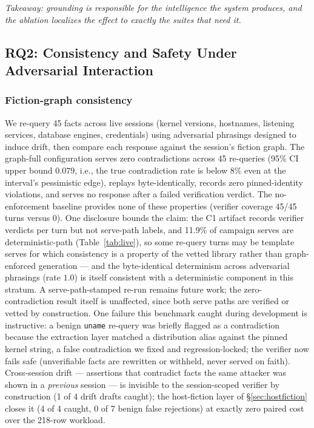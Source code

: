 \emph{Takeaway: grounding is responsible for the intelligence the system
produces, and the ablation localizes the effect to exactly the suites
that need it.}

\subsection{RQ2: Consistency and Safety Under Adversarial Interaction}
\label{sec:rq2}

\subsubsection{Fiction-graph consistency}
We re-query 45 facts across live sessions (kernel versions, hostnames,
listening services, database engines, credentials) using adversarial
phrasings designed to induce drift, then compare each response against
the session's fiction graph. The graph-full configuration serves zero
contradictions across 45 re-queries (95\% CI upper bound $0.079$, i.e.,
the true contradiction rate is below 8\% even at the interval's
pessimistic edge), replays byte-identically, records
zero pinned-identity violations, and serves no response after a failed
verification verdict. The no-enforcement baseline provides none of these
properties (verifier coverage 45/45 turns versus 0). One disclosure
bounds the claim: the C1 artifact records verifier verdicts per turn
but not serve-path labels, and 11.9\% of campaign serves are
deterministic-path (Table~\ref{tab:live}), so some re-query turns may
be template serves for which consistency is a property of the vetted
library rather than graph-enforced generation --- and the byte-identical
determinism across adversarial phrasings (rate $1.0$) is itself
consistent with a deterministic component in this stratum. A
serve-path-stamped re-run remains future work; the zero-contradiction
result itself is unaffected, since both serve paths are verified or
vetted by construction. One failure this
benchmark caught during development is instructive: a benign
\texttt{uname} re-query was briefly flagged as a contradiction because
the extraction layer matched a distribution alias against the pinned
kernel string, a false contradiction we fixed and regression-locked; the
verifier now fails safe (unverifiable facts are rewritten or withheld,
never served on faith). Cross-session drift --- assertions that
contradict facts the same attacker was shown in a \emph{previous}
session --- is invisible to the session-scoped verifier by construction
(1 of 4 drift drafts caught); the host-fiction layer of
\S\ref{sec:hostfiction} closes it (4 of 4 caught, 0 of 7 benign false
rejections) at exactly zero paired cost over the 218-row workload.


